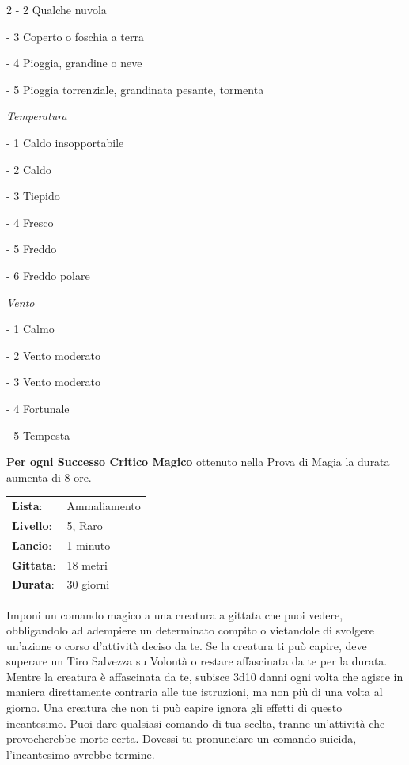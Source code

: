 \begin{multicols}{2}
- 2 Qualche nuvola

- 3 Coperto o foschia a terra

- 4 Pioggia, grandine o neve

- 5 Pioggia torrenziale, grandinata pesante, tormenta

\medskip

\emph{Temperatura}

- 1 Caldo insopportabile

- 2 Caldo

- 3 Tiepido

- 4 Fresco

- 5 Freddo

- 6 Freddo polare

\medskip

\emph{Vento}

- 1 Calmo

- 2 Vento moderato

- 3 Vento moderato

- 4 Fortunale

- 5 Tempesta

\medskip

\textbf{Per ogni Successo Critico Magico} ottenuto nella Prova di Magia la durata aumenta di 8 ore.

\noindent\begin{tabularx}{\linewidth}{p{1.9cm}X}
	\rowcolor{gray!20}\textbf{Lista}: & Ammaliamento \\
	\textbf{Livello}: & 5, Raro \\
	\rowcolor{gray!20}\textbf{Lancio}: & 1 minuto \\
	\textbf{Gittata}: & 18 metri \\
	\rowcolor{gray!20}\textbf{Durata}: & 30 giorni \\
\end{tabularx}\smallskip

Imponi un comando magico a una creatura a gittata che puoi vedere, obbligandolo ad adempiere un determinato compito o vietandole di svolgere un'azione o corso d'attività deciso da te. Se la creatura ti può capire, deve superare un Tiro Salvezza su Volontà o restare affascinata da te per la durata. Mentre la creatura è affascinata da te, subisce 3d10 danni ogni volta che agisce in maniera direttamente contraria alle tue istruzioni, ma non più di una volta al giorno. Una creatura che non ti può capire ignora gli effetti di questo incantesimo. Puoi dare qualsiasi comando di tua scelta, tranne un'attività che provocherebbe morte certa. Dovessi tu pronunciare un comando suicida, l'incantesimo avrebbe termine.


\end{multicols}
